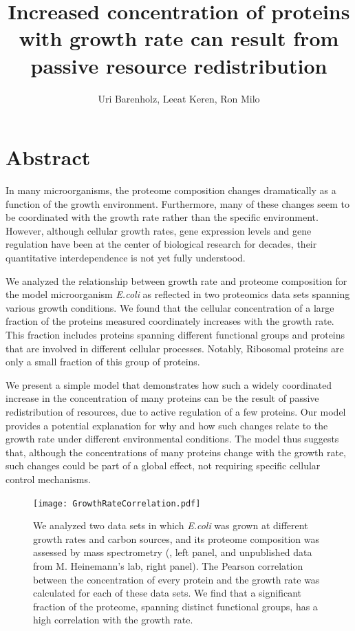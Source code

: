 \documentclass[a4paper,landscape,titlepage,17pt]{extarticle}
\title{\Huge Increased concentration of proteins with growth rate can result from passive resource redistribution}
\author{\Large Uri Barenholz, Leeat Keren, Ron Milo}
\affil{The Weizmann Institute of Science, Rehovot, Israel}
\date{}
\begin{document}
\maketitle
\section*{\LARGE Abstract}
In many microorganisms, the proteome composition changes dramatically as a function of the growth environment.
Furthermore, many of these changes seem to be coordinated with the growth rate rather than the specific environment.
However, although cellular growth rates, gene expression levels and gene regulation have been at the center of biological research for decades, their quantitative interdependence is not yet fully understood.

We analyzed the relationship between growth rate and proteome composition for the model microorganism \emph{E.coli} as reflected in two proteomics data sets spanning various growth conditions.
We found that the cellular concentration of a large fraction of the proteins measured coordinately increases with the growth rate.
This fraction includes proteins spanning different functional groups and proteins that are involved in different cellular processes.
Notably, Ribosomal proteins are only a small fraction of this group of proteins.

We present a simple model that demonstrates how such a widely coordinated increase in the concentration of many proteins can be the result of passive redistribution of resources, due to active regulation of a few proteins.
Our model provides a potential explanation for why and how such changes relate to the growth rate under different environmental conditions.
The model thus suggests that, although the concentrations of many proteins change with the growth rate, such changes could be part of a global effect, not requiring specific cellular control mechanisms.
\clearpage        

\begin{figure}[h]
\centering
\texttt{[image: GrowthRateCorrelation.pdf]}
\caption{\linespread{0.5}\selectfont{}
  We analyzed two data sets in which \emph{E.coli} was grown at different growth rates and carbon sources, and its proteome composition was assessed by mass spectrometry (\parencite{Valgepea2013}, left panel, and unpublished data from M. Heinemann's lab, right panel).
The Pearson correlation between the concentration of every protein and the growth rate was calculated for each of these data sets.
We find that a significant fraction of the proteome, spanning distinct functional groups, has a high correlation with the growth rate.
}
\label{fig:growthcorr}
\end{figure}
\end{document}
